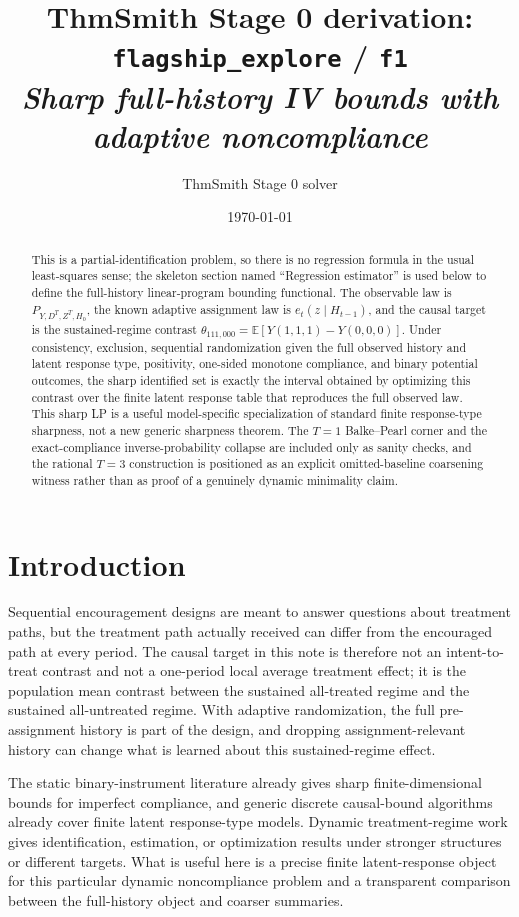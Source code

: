 \documentclass[11pt]{article}
\title{ThmSmith Stage 0 derivation: \texttt{flagship\_explore} / \texttt{f1}%
  \\ \large\textit{Sharp full-history IV bounds with adaptive noncompliance}}
\author{ThmSmith Stage 0 solver}
\date{\today}
\newcommand{\E}{\mathbb{E}}
\theoremstyle{definition}
\theoremstyle{plain}
\theoremstyle{remark}
\begin{document}
\maketitle


\begin{abstract}
This is a partial-identification problem, so there is no regression formula in the usual least-squares sense; the skeleton section named ``Regression estimator'' is used below to define the full-history linear-program bounding functional.  The observable law is \(P_{Y,D^T,Z^T,H_0}\), the known adaptive assignment law is \(e_t(z\mid H_{t-1})\), and the causal target is the sustained-regime contrast \(\theta_{111,000}=\E[Y(1,1,1)-Y(0,0,0)]\).  Under consistency, exclusion, sequential randomization given the full observed history and latent response type, positivity, one-sided monotone compliance, and binary potential outcomes, the sharp identified set is exactly the interval obtained by optimizing this contrast over the finite latent response table that reproduces the full observed law.  This sharp LP is a useful model-specific specialization of standard finite response-type sharpness, not a new generic sharpness theorem.  The \(T=1\) Balke--Pearl corner and the exact-compliance inverse-probability collapse are included only as sanity checks, and the rational \(T=3\) construction is positioned as an explicit omitted-baseline coarsening witness rather than as proof of a genuinely dynamic minimality claim.
\end{abstract}

\section{Introduction}
Sequential encouragement designs are meant to answer questions about treatment paths, but the treatment path actually received can differ from the encouraged path at every period.  The causal target in this note is therefore not an intent-to-treat contrast and not a one-period local average treatment effect; it is the population mean contrast between the sustained all-treated regime and the sustained all-untreated regime.  With adaptive randomization, the full pre-assignment history is part of the design, and dropping assignment-relevant history can change what is learned about this sustained-regime effect.

The static binary-instrument literature already gives sharp finite-dimensional bounds for imperfect compliance, and generic discrete causal-bound algorithms already cover finite latent response-type models.  Dynamic treatment-regime work gives identification, estimation, or optimization results under stronger structures or different targets.  What is useful here is a precise finite latent-response object for this particular dynamic noncompliance problem and a transparent comparison between the full-history object and coarser summaries.
\end{document}
